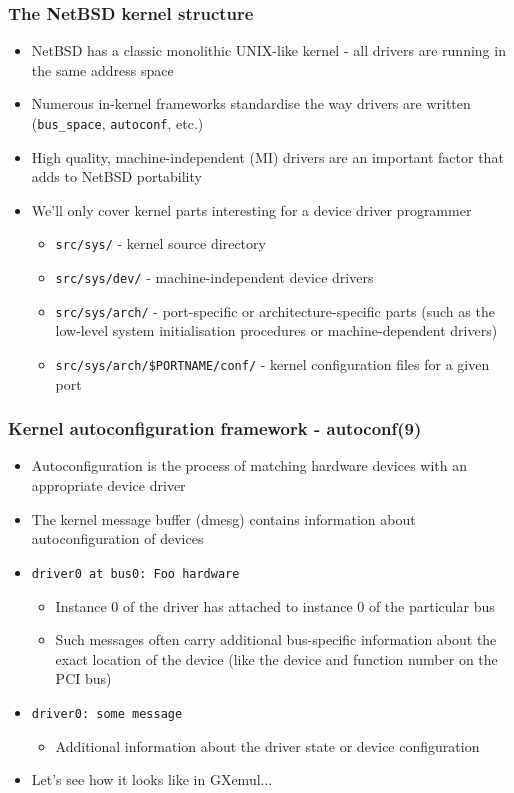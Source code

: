 \documentclass[dvipsnames,table]{beamer}
\begin{document}
\begin{frame}
\frametitle{The NetBSD kernel structure}
\begin{itemize}
	\item NetBSD has a classic monolithic UNIX-like kernel - all drivers are running in the same address space
	\item Numerous in-kernel frameworks standardise the way drivers are written ({\tt bus\_space}, {\tt autoconf}, etc.) 
	\item High quality, machine-independent (MI) drivers are an important factor that adds to NetBSD portability
	\item We'll only cover kernel parts interesting for a device driver programmer
	\begin{itemize}
	\item {\tt src/sys/} - kernel source directory
	\item {\tt src/sys/dev/} - machine-independent device drivers
	\item {\tt src/sys/arch/} - port-specific or architecture-specific parts (such as the low-level system initialisation procedures or machine-dependent drivers)
	\item {\tt src/sys/arch/\$PORTNAME/conf/} - kernel configuration files for a given port
	\end{itemize}

\end{itemize}
\end{frame}

\begin{frame}
\frametitle{Kernel autoconfiguration framework - autoconf(9)}
\begin{itemize}
	\item Autoconfiguration is the process of matching hardware devices with an
     appropriate device driver
    \item The kernel message buffer (dmesg) contains information about autoconfiguration of devices
    \item {\tt driver0 at bus0: Foo hardware} 
    \begin{itemize}
    	\item Instance 0 of the driver has attached to instance 0 of the particular bus
		\item Such messages often carry additional bus-specific information about the exact location of the device (like the device and function number on the PCI bus)
	\end{itemize}
    \item {\tt driver0: some message}
    \begin{itemize}
    	\item Additional information about the driver state or device configuration
	\end{itemize}
	\item Let's see how it looks like in GXemul...
\end{itemize}
\end{frame}
\end{document}
